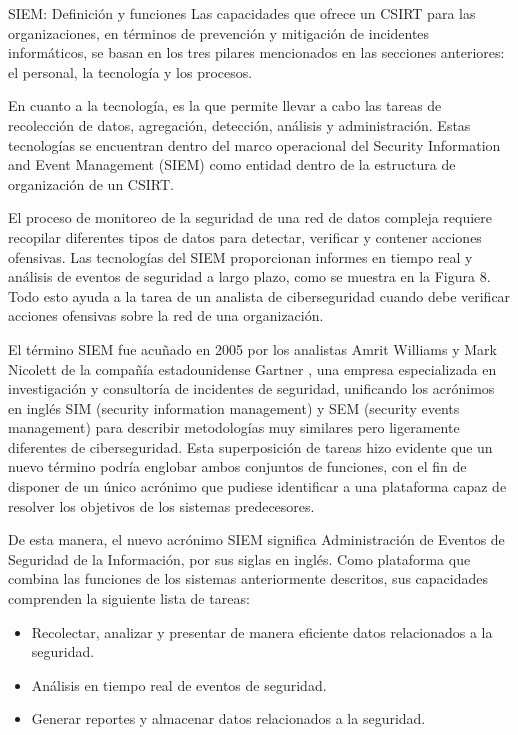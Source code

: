     \begin{section}{SIEM: Definición y funciones}
    Las capacidades que ofrece un CSIRT para las organizaciones, en términos de prevención y mitigación de incidentes informáticos, se basan en los tres pilares mencionados en las secciones anteriores: el personal, la tecnología y los procesos. \par
    En cuanto a la tecnología, es la que permite llevar a cabo las tareas de recolección de datos, agregación, detección, análisis y administración. Estas tecnologías se encuentran dentro del marco operacional del Security Information and Event Management (SIEM) como entidad dentro de la estructura de organización de un CSIRT. \par
    El proceso de monitoreo de la seguridad de una red de datos compleja requiere recopilar diferentes tipos de datos para detectar, verificar y contener acciones ofensivas. Las tecnologías del SIEM proporcionan informes en tiempo real y análisis de eventos de seguridad a largo plazo, como se muestra en la Figura 8. Todo esto ayuda a la tarea de un analista de ciberseguridad cuando debe verificar acciones ofensivas sobre la red de una organización. \par
    El término SIEM fue acuñado en 2005 por los analistas Amrit Williams y Mark Nicolett de la compañía estadounidense Gartner \cite{def_siem}, una empresa especializada en investigación y consultoría de incidentes de seguridad, unificando los acrónimos en inglés SIM (security information management) y SEM (security events management) para describir metodologías muy similares pero ligeramente diferentes de ciberseguridad. Esta superposición de tareas hizo evidente que un nuevo término podría englobar ambos conjuntos de funciones, con el fin de disponer de un único acrónimo que pudiese identificar a una plataforma capaz de resolver los objetivos de los sistemas predecesores. \par
    De esta manera, el nuevo acrónimo SIEM significa Administración de Eventos de Seguridad de la Información, por sus siglas en inglés. Como plataforma que combina las funciones de los sistemas anteriormente descritos, sus capacidades comprenden la siguiente lista de tareas:
    \begin{itemize}
        \item Recolectar, analizar y presentar de manera eficiente datos relacionados a la seguridad.
        \item Análisis en tiempo real de eventos de seguridad.
        \item Generar reportes y almacenar datos relacionados a la seguridad.

\end{itemize}
\end{section}

